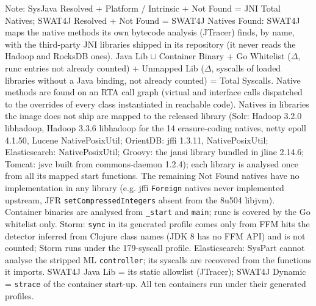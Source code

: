 \begin{table}[t]
\begin{minipage}{\textwidth}
Note: SysJava Resolved + Platform / Intrinsic + Not Found = JNI Total Natives; SWAT4J Resolved + Not Found = SWAT4J Natives Found: SWAT4J maps the native methods its own bytecode analysis (JTracer) finds, by name, with the third-party JNI libraries shipped in its repository (it never reads the Hadoop and RocksDB ones). Java Lib $\cup$ Container Binary + Go Whitelist ($\Delta$, runc entries not already counted) + Unmapped Lib ($\Delta$, syscalls of loaded libraries without a Java binding, not already counted) = Total Syscalls. Native methods are found on an RTA call graph (virtual and interface calls dispatched to the overrides of every class instantiated in reachable code). Natives in libraries the image does not ship are mapped to the released library (Solr: Hadoop 3.2.0 libhadoop, Hadoop 3.3.6 libhadoop for the 14 erasure-coding natives, netty epoll 4.1.50, Lucene NativePosixUtil; OrientDB: jffi 1.3.11, NativePosixUtil; Elasticsearch: NativePosixUtil; Groovy: the jansi library bundled in jline 2.14.6; Tomcat: jsvc built from commons-daemon 1.2.4); each library is analysed once from all its mapped start functions. The remaining Not Found natives have no implementation in any library (e.g. jffi \texttt{Foreign} natives never implemented upstream, JFR \texttt{setCompressedIntegers} absent from the 8u504 libjvm). Container binaries are analysed from \texttt{\_start} and \texttt{main}; runc is covered by the Go whitelist only. Storm: \texttt{sync} in its generated profile comes only from FFM hits the detector inferred from Clojure class names (JDK 8 has no FFM API) and is not counted; Storm runs under the 179-syscall profile. Elasticsearch: SysPart cannot analyse the stripped ML \texttt{controller}; its syscalls are recovered from the functions it imports. SWAT4J Java Lib = its static allowlist (JTracer); SWAT4J Dynamic = \texttt{strace} of the container start-up. All ten containers run under their generated profiles.
\end{minipage}
\end{table}
